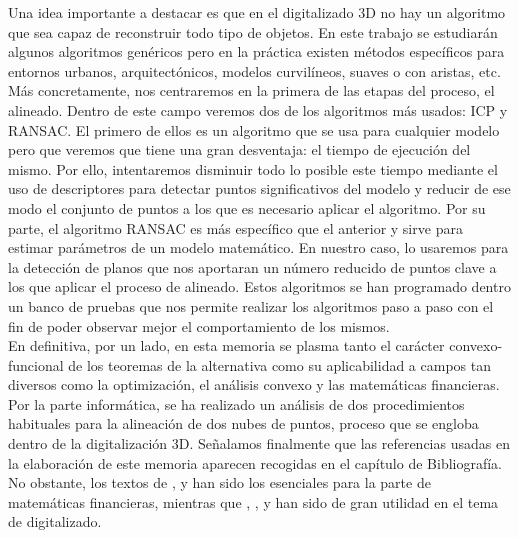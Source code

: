 Una idea importante a destacar es que en el digitalizado 3D no hay un algoritmo que sea capaz de reconstruir todo tipo de objetos. En este trabajo se estudiarán algunos algoritmos genéricos pero en la práctica existen métodos específicos para entornos urbanos, arquitectónicos, modelos curvilíneos, suaves o con aristas, etc. Más concretamente, nos centraremos en la primera de las etapas del proceso, el alineado. Dentro de este campo veremos dos de los algoritmos más usados: ICP y RANSAC. El primero de ellos es un algoritmo que se usa para cualquier modelo pero que veremos que tiene una gran desventaja: el tiempo de ejecución del mismo. Por ello, intentaremos disminuir todo lo posible este tiempo mediante el uso de descriptores para detectar puntos significativos del modelo y reducir de ese modo el conjunto de puntos a los que es necesario aplicar el algoritmo. Por su parte, el algoritmo RANSAC es más específico que el anterior y sirve para estimar parámetros de un modelo matemático. En nuestro caso, lo usaremos para la detección de planos que nos aportaran un número reducido de puntos clave a los que aplicar el proceso de alineado. Estos algoritmos se han programado dentro un banco de pruebas que nos permite realizar los algoritmos paso a paso con el fin de poder observar mejor el comportamiento de los mismos.\\

En definitiva, por un lado, en esta memoria se plasma tanto el carácter convexo-funcional de los teoremas de la alternativa como su aplicabilidad a campos tan diversos como la optimización, el análisis convexo y las matemáticas financieras. Por la parte informática, se ha realizado un análisis de dos procedimientos habituales para la alineación de dos nubes de puntos, proceso que se engloba dentro de la digitalización 3D. Señalamos finalmente que las referencias usadas en la elaboración de este memoria aparecen recogidas en el capítulo de Bibliografía. No obstante, los textos de \cite{borwein}, \cite{elliot1999mathematics} y \cite{Simons2008} han sido los esenciales para la parte de matemáticas financieras, mientras que \cite{QuatYan}, \cite{ICPBesl}, \cite{fischler1981random} y \cite{QT+Opengl} han sido de gran utilidad en el tema de digitalizado.
